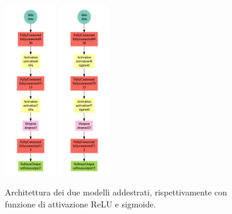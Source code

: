 \begin{figure}[H]
	\centering
	\includegraphics[width=0.2\textwidth]{images/ml/mlp/relu}
	\includegraphics[width=0.2\textwidth]{images/ml/mlp/sigmoid}
	\caption{Architettura dei due modelli addestrati, rispettivamente con 
	funzione di attivazione ReLU e sigmoide.}
	\label{fig:mlp_architecture}
\end{figure}
